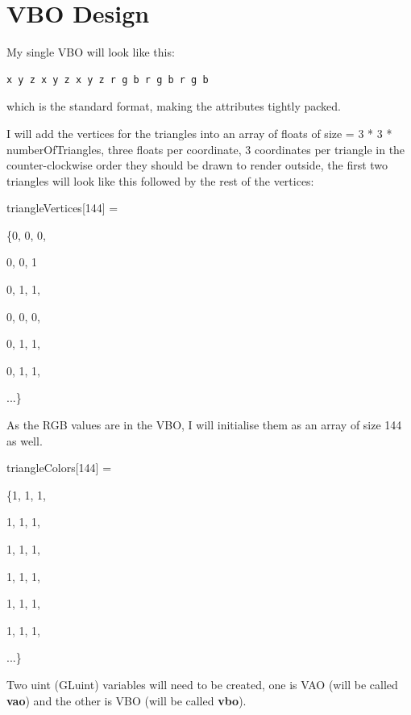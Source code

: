 \documentclass[10pt]{report}
\begin{document}
\section{VBO Design}

My single VBO will look like this:
\begin{verbatim}
x y z x y z x y z r g b r g b r g b
\end{verbatim}
which is the standard format, making the attributes tightly packed.

I will add the vertices for the triangles into an array of floats of size = 3 * 3 * numberOfTriangles, three floats per coordinate, 3 coordinates per triangle in the counter-clockwise order they should be drawn to render outside, the first two triangles will look like this followed by the rest of the vertices:

triangleVertices[144] = 

\{0, 0, 0,

0, 0, 1

0, 1, 1,

0, 0, 0,

0, 1, 1,

0, 1, 1,

...\}


As the RGB values are in the VBO, I will initialise them as an array of size 144 as well.

triangleColors[144] = 

\{1, 1, 1,

1, 1, 1,

1, 1, 1,

1, 1, 1,

1, 1, 1,

1, 1, 1, 

...\}


Two uint (GLuint) variables will need to be created, one is VAO (will be called \textbf{vao}) and the other is VBO (will be called \textbf{vbo}).
\end{document}
